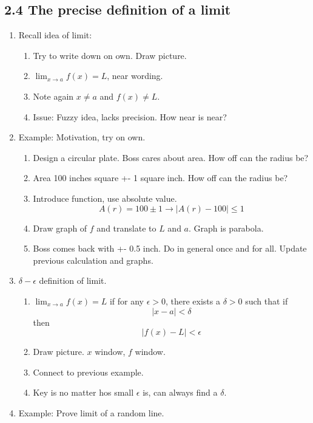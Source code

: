 \documentclass{article}
\begin{document}
\subsection{2.4 The precise definition of a limit}
\begin{enumerate}

\item Recall idea of limit: 
\begin{enumerate}
\item Try to write down on own. Draw picture.
\item $\lim_{x \rightarrow a} f(x) = L$, near wording. 
\item Note again $x \neq a$ and $f(x) \neq L$.
\item Issue: Fuzzy idea, lacks precision. How near is near?
\end{enumerate}

\item Example: Motivation, try on own.
\begin{enumerate}
\item Design a circular plate. Boss cares about area. How off can the radius be?
\item Area 100 inches square +- 1 square inch. How off can the radius be? 
\item Introduce function, use absolute value.
\[
A(r) = 100 \pm 1 \rightarrow |A(r)-100| \leq 1
\]
\item Draw graph of $f$ and translate to $L$ and $a$. Graph is parabola.
\item Boss comes back with +- 0.5 inch. Do in general once and for all. Update previous calculation and graphs.
\end{enumerate}

\item $\delta - \epsilon$ definition of limit.
\begin{enumerate}
\item $\lim_{x \rightarrow a} f(x) = L$ if for any $\epsilon >0$, there exists a $\delta >0$ such that if
\[
|x-a| < \delta
\]
then
\[
|f(x)-L| < \epsilon
\]
\item Draw picture. $x$ window, $f$ window.
\item Connect to previous example. 
\item Key is no matter hos small $\epsilon$ is, can always find a $\delta$.
\end{enumerate}

\item Example: Prove limit of a random line.

\end{enumerate}
\end{document}
